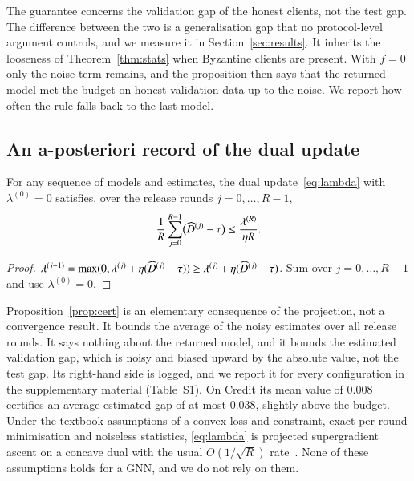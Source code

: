 The guarantee concerns the validation gap of the honest clients, not the test gap. The difference between the two is a generalisation gap that no protocol-level argument controls, and we measure it in Section~\ref{sec:results}. It inherits the looseness of Theorem~\ref{thm:stats} when Byzantine clients are present. With $f=0$ only the noise term remains, and the proposition then says that the returned model met the budget on honest validation data up to the noise. We report how often the rule falls back to the last model.

\subsection{An a-posteriori record of the dual update}

\begin{proposition}\label{prop:cert}
For any sequence of models and estimates, the dual update~\eqref{eq:lambda} with $\lambda^{(0)}=0$ satisfies, over the release rounds $j=0,\dots,R-1$,
\begin{equation}\label{eq:cert}
\frac{1}{R}\sum_{j=0}^{R-1}\bigl(\widehat{D}^{(j)}-\tau\bigr)\le\frac{\lambda^{(R)}}{\eta R}.
\end{equation}
\end{proposition}

\begin{proof}
$\lambda^{(j+1)}=\max(0,\lambda^{(j)}+\eta(\widehat{D}^{(j)}-\tau))\ge\lambda^{(j)}+\eta(\widehat{D}^{(j)}-\tau)$. Sum over $j=0,\dots,R-1$ and use $\lambda^{(0)}=0$.
\end{proof}

Proposition~\ref{prop:cert} is an elementary consequence of the projection, not a convergence result. It bounds the average of the noisy estimates over all release rounds. It says nothing about the returned model, and it bounds the estimated validation gap, which is noisy and biased upward by the absolute value, not the test gap. Its right-hand side is logged, and we report it for every \clamp{} configuration in the supplementary material (Table~S1). On Credit its mean value of 0.008 certifies an average estimated gap of at most 0.038, slightly above the budget. Under the textbook assumptions of a convex loss and constraint, exact per-round minimisation and noiseless statistics, \eqref{eq:lambda} is projected supergradient ascent on a concave dual with the usual $O(1/\sqrt{R})$ rate~\citep{cotter2019optimization}. None of these assumptions holds for a GNN, and we do not rely on them.
